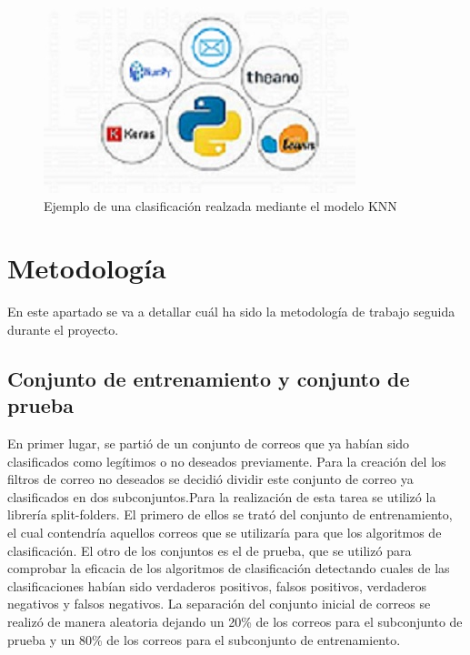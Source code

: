 \documentclass[conference,a4paper]{IEEEtran}
\begin{document}
\newpage

\begin{figure}
  \centering
  \includegraphics{librerias}
  \caption{Ejemplo de una clasificación realzada mediante el modelo KNN}
  \label{fig:librerias}
\end{figure}


\section{Metodología}

En este apartado se va a detallar cuál ha sido la metodología de trabajo seguida durante el proyecto. 
\subsection{Conjunto de entrenamiento y conjunto de prueba}
En primer lugar, se partió de un conjunto de correos que ya habían sido clasificados como legítimos o no deseados previamente. Para la creación del los filtros de correo no deseados se decidió dividir este conjunto de correo ya clasificados en dos subconjuntos.Para la realización de esta tarea se utilizó la librería split-folders. El primero de ellos se trató del conjunto de entrenamiento, el cual contendría aquellos correos que se utilizaría para que los algoritmos de clasificación. El otro de los conjuntos es el de prueba, que se utilizó para comprobar la eficacia de los algoritmos de clasificación detectando cuales de las clasificaciones habían sido verdaderos positivos, falsos positivos, verdaderos negativos y falsos negativos. La separación del conjunto inicial de correos se realizó de manera aleatoria dejando un 20\% de los correos para el subconjunto de prueba y un 80\% de los correos para el subconjunto de entrenamiento.
\end{document}
